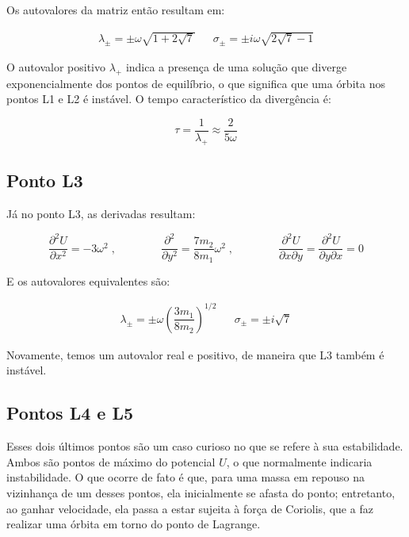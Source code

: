\vspace{10px}

Os autovalores da matriz então resultam em:

\vspace{-13px}

\begin{align}
\lambda_{\pm} = \pm \omega \sqrt{1+2\sqrt{7}} && \sigma_{\pm} = \pm i\omega \sqrt{2\sqrt{7}-1}
\end{align}

O autovalor positivo $\lambda_+$ indica a presença de uma solução que diverge exponencialmente dos pontos de equilíbrio, o que significa que uma órbita nos pontos L1 e L2 é instável. O tempo característico da divergência é:

\begin{equation}
\tau = \frac{1}{\lambda_+} \approx \frac{2}{5\omega}
\end{equation}

\subsection{Ponto L3}

Já no ponto L3, as derivadas resultam:

\begin{equation}
\dfrac{\partial ^2U}{\partial x^2} = -3\omega^2 \;, \qquad \qquad \dfrac{\partial ^2}{\partial y^2} = \frac{7m_2}{8m_1}\omega^2 \;, \qquad \qquad \dfrac{\partial ^2U}{\partial x\partial y} = \dfrac{\partial ^2U}{\partial y\partial x} = 0
\end{equation}

E os autovalores equivalentes são:

\begin{align}
\lambda_{\pm} = \pm \omega \left(\dfrac{3m_1}{8m_2}\right)^{1/2} && \sigma_{\pm} = \pm i\sqrt{7}
\end{align}

Novamente, temos um autovalor real e positivo, de maneira que L3 também é instável.

\subsection{Pontos L4 e L5}

Esses dois últimos pontos são um caso curioso no que se refere à sua estabilidade. Ambos são pontos de máximo do potencial $U$, o que normalmente indicaria instabilidade. O que ocorre de fato é que, para uma massa em repouso na vizinhança de um desses pontos, ela inicialmente se afasta do ponto; entretanto, ao ganhar velocidade, ela passa a estar sujeita à força de Coriolis, que a faz realizar uma órbita em torno do ponto de Lagrange.

